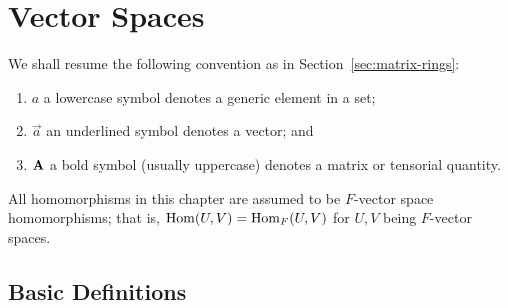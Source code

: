 \chapter{Vector Spaces}\label{sec:linear-algebra}\label{sec:vsp}

\begin{remark}
    We shall resume the following convention as in Section~\ref{sec:matrix-rings}:
    \begin{enumerate}[label={(\roman*)}, itemsep=0mm]
        \item \(a\) a lowercase symbol denotes a generic element in a set;
        \item \(\vec{a}\) an underlined symbol denotes a vector; and
        \item \(\vb{A}\) a bold symbol (usually uppercase)
            denotes a matrix or tensorial quantity.
    \end{enumerate}
\end{remark}
\begin{remark}
    All homomorphisms in this chapter are assumed to be \(F\)-vector space homomorphisms;
    that is, \(\operatorname{Hom}(U,V) = \operatorname{Hom}_F(U,V)\) for \(U,V\) being \(F\)-vector spaces.
\end{remark}

\section{Basic Definitions}


